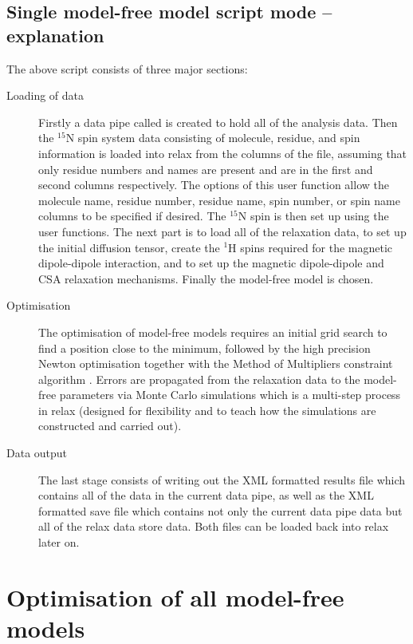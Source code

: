 \subsection{Single model-free model script mode -- explanation}

The above script consists of three major sections:
\begin{description}
  \item[Loading of data] Firstly a data pipe called  is created to hold all of the analysis data.
    Then the $^{15}$N spin system data consisting of molecule, residue, and spin information is loaded into relax from the columns of the  file, assuming that only residue numbers and names are present and are in the first and second columns respectively.
    The options of this  user function allow the molecule name, residue number, residue name, spin number, or spin name columns to be specified if desired.
    The $^{15}$N spin is then set up using the  user functions.
    The next part is to load all of the relaxation data, to set up the initial diffusion tensor, create the $^1$H spins required for the magnetic dipole-dipole interaction, and to set up the magnetic dipole-dipole and CSA relaxation mechanisms.
    Finally the model-free model  is chosen.
  \item[Optimisation] The optimisation of model-free models requires an initial grid search to find a position close to the minimum, followed by the high precision Newton optimisation together with the Method of Multipliers constraint algorithm \citep{dAuvergneGooley08a}.
    Errors are propagated from the relaxation data to the model-free parameters via Monte Carlo simulations which is a multi-step process in relax (designed for flexibility and to teach how the simulations are constructed and carried out).
  \item[Data output] The last stage consists of writing out the XML formatted results file which contains all of the data in the current data pipe, as well as the XML formatted save file which contains not only the current data pipe data but all of the relax data store data.
    Both files can be loaded back into relax later on.
\end{description}




\section{Optimisation of all model-free models}


